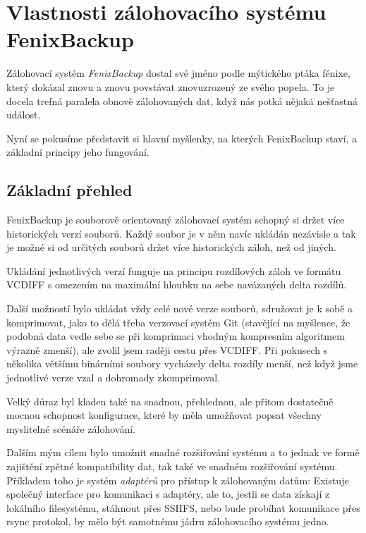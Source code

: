 \chapter{Vlastnosti zálohovacího systému FenixBackup}

Zálohovací systém {\it FenixBackup} dostal své jméno podle mýtického ptáka
fénixe, který dokázal znovu a znovu povstávat znovuzrozený ze svého popela. To
je docela trefná paralela obnově zálohovaných dat, když nás potká nějaká
nešťastná událost.

Nyní se pokusíme představit si hlavní myšlenky, na kterých FenixBackup staví,
a základní principy jeho fungování.

\section{Základní přehled}

FenixBackup je souborově orientovaný zálohovací systém schopný si držet více
historických verzí souborů. Každý soubor je v něm navíc ukládán nezávisle a tak
je možné si od určitých souborů držet více historických záloh, než od jiných.

Ukládání jednotlivých verzí funguje na principu rozdílových záloh ve formátu
\gls{VCDIFF} s omezením na maximální hloubku na sebe navázaných delta rozdílů.

Další možností bylo ukládat vždy celé nové verze souborů, sdružovat je k sobě
a komprimovat, jako to dělá třeba verzovací systém Git (stavějící na myšlence,
že podobná data vedle sebe se při komprimaci vhodným kompresním algoritmem
výrazně zmenší), ale zvolil jsem raději cestu přes \gls{VCDIFF}. Při pokusech
s několika většímu binárními soubory vycházely delta rozdíly menší, než když
jsme jednotlivé verze vzal a dohromady zkomprimoval.

Velký důraz byl kladen také na snadnou, přehlednou, ale přitom dostatečně mocnou
schopnost konfigurace, které by měla umožňovat popsat všechny myslitelné
scénáře zálohování.


Dalším mým cílem bylo umožnit snadné rozšiřování systému a to jednak ve formě
zajištění zpětné kompatibility dat, tak také ve snadném rozšiřování systému.
Příkladem toho je systém {\it adaptérů} pro přístup k zálohovaným datům:
Existuje společný interface pro komunikaci s adaptéry, ale to, jestli se data
získají z lokálního filesystému, stáhnout přes \gls{SSHFS}, nebo bude probíhat
komunikace přes rsync protokol, by mělo být samotnému jádru zálohovacího
systému jedno.

